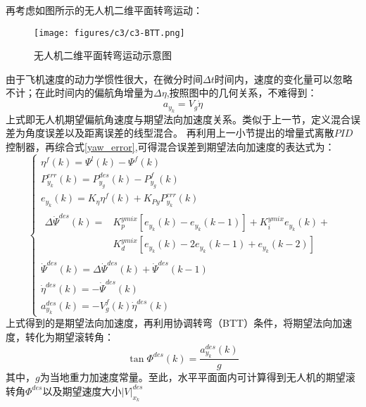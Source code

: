 再考虑如图所示的无人机二维平面转弯运动：
\begin{figure}[H]
    \centering
    \texttt{[image: figures/c3/c3-BTT.png]}
    \caption{无人机二维平面转弯运动示意图}\label{fig:c3-BTT}
\end{figure}
由于飞机速度的动力学惯性很大，在微分时间$\Delta t$时间内，速度的变化量可以忽略不计；在此时间内的偏航角增量为$\Delta\eta$,按照图中的几何关系，不难得到：
\begin{equation}
    a_{y_k}=V_g\dot{\eta}
    \label{btt_dot}
\end{equation}
上式即无人机期望偏航角速度与期望法向加速度关系。类似于上一节，定义混合误差为角度误差以及距离误差的线型混合。
再利用上一小节提出的增量式离散$PID$控制器，再综合式\ref{yaw_error},可得混合误差到期望法向加速度的表达式为：
\begin{equation}
    \left\{
        \begin{array}{l}
            \eta^f(k)=\Psi^l(k)-\Psi^f(k)\\
            P_{y_k}^{err}(k)=P_{y_g}^{des}(k)-P_{y_g}^{f}(k)\\
            e_{y_k}(k)=K_{\eta}\eta^f(k)+K_{Py}P_{y_k}^{err}(k)\\
                \begin{aligned}
                \Delta\dot{\Psi}^{des}(k)=&K_{p}^{ymix}[e_{y_k}(k)-e_{y_k}(k-1)]+K_{i}^{ymix}e_{y_k}(k)+\\
                &K_{d}^{ymix}[e_{y_k}(k)-2e_{y_k}(k-1)+e_{y_k}(k-2)]
                \end{aligned}\\
            \dot{\Psi}^{des}(k)=\Delta\dot{\Psi}^{des}(k)+\dot{\Psi}^{des}(k-1)\\
            \dot{\eta}^{des}(k)=-\dot{\Psi}^{des}(k)\\
            a_{y_k}^{des}(k)=-V_g^{f}(k)\dot{\eta}^{des}(k)
    \end{array}
\right .
    \label{angle_controller}
\end{equation}
上式得到的是期望法向加速度，再利用协调转弯（BTT）条件，将期望法向加速度，转化为期望滚转角：
\begin{equation}
    \tan\Phi^{des}(k)=\frac{a_{y_k}^{des}(k)}{g}
    \label{btt_a2roll}
\end{equation}
其中，$g$为当地重力加速度常量。至此，水平平面面内可计算得到无人机的期望滚转角$\Phi^{des}$以及期望速度大小$|V|_{x_k}^{des}$
